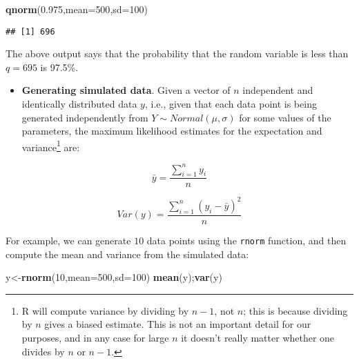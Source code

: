 \documentclass[12pt,]{krantz}
\newenvironment{Shaded}{\begin{snugshade}}{\end{snugshade}}
\newcommand{\DataTypeTok}[1]{\textcolor[rgb]{0.13,0.29,0.53}{#1}}
\newcommand{\DecValTok}[1]{\textcolor[rgb]{0.00,0.00,0.81}{#1}}
\newcommand{\FloatTok}[1]{\textcolor[rgb]{0.00,0.00,0.81}{#1}}
\newcommand{\KeywordTok}[1]{\textcolor[rgb]{0.13,0.29,0.53}{\textbf{#1}}}
\newcommand{\NormalTok}[1]{#1}
\providecommand{\tightlist}{%
  \setlength{\itemsep}{0pt}\setlength{\parskip}{0pt}}
\begin{document}
\begin{Shaded}
\begin{Highlighting}[]
\KeywordTok{qnorm}\NormalTok{(}\FloatTok{0.975}\NormalTok{,}\DataTypeTok{mean=}\DecValTok{500}\NormalTok{,}\DataTypeTok{sd=}\DecValTok{100}\NormalTok{)}
\end{Highlighting}
\end{Shaded}

\begin{verbatim}
## [1] 696
\end{verbatim}

The above output says that the probability that the random variable is less than \(q=695\) is 97.5\%.

\begin{itemize}
\tightlist
\item
  \textbf{Generating simulated data}. Given a vector of \(n\) independent and identically distributed data \(y\), i.e., given that each data point is being generated independently from \(Y \sim Normal(\mu,\sigma)\) for some values of the parameters, the maximum likelihood estimates for the expectation and variance\footnote{R will compute variance by dividing by \(n-1\), not \(n\); this is because dividing by \(n\) gives a biased estimate. This is not an important detail for our purposes, and in any case for large \(n\) it doesn't really matter whether one divides by \(n\) or \(n-1\).} are:
\end{itemize}

\begin{equation}
\bar{y} =  \frac{\sum_{i=1}^n y_i}{n} 
\end{equation}

\begin{equation}
Var(y) = \frac{\sum_{i=1}^n (y_i-
\bar{y})^2}{n}
\end{equation}

For example, we can generate \(10\) data points using the \texttt{rnorm} function, and then compute the mean and variance from the simulated data:

\begin{Shaded}
\begin{Highlighting}[]
\NormalTok{y<-}\KeywordTok{rnorm}\NormalTok{(}\DecValTok{10}\NormalTok{,}\DataTypeTok{mean=}\DecValTok{500}\NormalTok{,}\DataTypeTok{sd=}\DecValTok{100}\NormalTok{)}
\KeywordTok{mean}\NormalTok{(y);}\KeywordTok{var}\NormalTok{(y)}
\end{Highlighting}
\end{Shaded}
\end{document}
